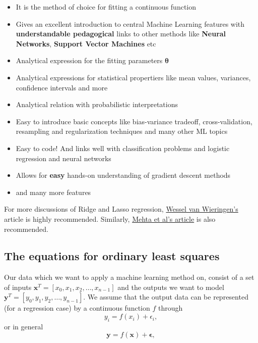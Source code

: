 \documentclass[%
oneside,                 %
final,                   %
10pt]{article}
\begin{document}
\begin{itemize}
\item It is the method of choice for fitting a continuous function

\item Gives an excellent introduction to central Machine Learning features with \textbf{understandable pedagogical} links to other methods like \textbf{Neural Networks}, \textbf{Support Vector Machines} etc

\item Analytical expression for the fitting parameters $\bm{\theta}$

\item Analytical expressions for statistical propertiers like mean values, variances, confidence intervals and more

\item Analytical relation with probabilistic interpretations 

\item Easy to introduce basic concepts like bias-variance tradeoff, cross-validation, resampling and regularization techniques and many other ML topics

\item Easy to code! And links well with classification problems and logistic regression and neural networks

\item Allows for \textbf{easy} hands-on understanding of gradient descent methods

\item and many more features
\end{itemize}

\noindent
For more discussions of Ridge and Lasso regression, \href{{https://arxiv.org/abs/1509.09169}}{Wessel van Wieringen's} article is highly recommended.
Similarly, \href{{https://arxiv.org/abs/1803.08823}}{Mehta et al's article} is also recommended.

\subsection*{The equations for ordinary least squares}

Our data which we want to apply a machine learning method on, consist
of a set of inputs $\bm{x}^T=[x_0,x_1,x_2,\dots,x_{n-1}]$ and the
outputs we want to model $\bm{y}^T=[y_0,y_1,y_2,\dots,y_{n-1}]$.
We assume  that the output data can be represented (for a regression case) by a continuous function $f$
through
\[
y_i=f(x_i)+\epsilon_i,
\]
or in general
\[
\bm{y}=f(\bm{x})+\bm{\epsilon},
\]
\end{document}
